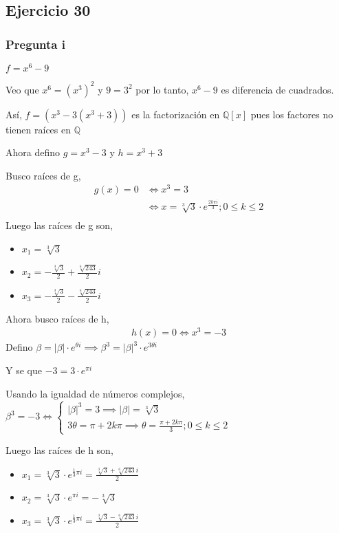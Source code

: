 \subsection{Ejercicio 30}

\subsubsection{Pregunta i}
$ f = x^6 - 9 $

Veo que $ x^6 = (x^3)^2 $ y $ 9 = 3^2 $ por lo tanto, $ x^6 - 9 $ es diferencia de cuadrados.

Así, $ f = (x^3 - 3 (x^3 + 3)) $ es la factorización en $ \mathbb{Q}[x] $ pues los factores no tienen raíces en $ \mathbb{Q} $

Ahora defino $ g = x^3 - 3 $ y $ h = x^3 + 3 $

Busco raíces de g,
\begin{align*}
    g(x) = 0 &\iff x^3 = 3 \\
    &\iff x = \sqrt[3]{3} \cdot e^{\frac{2k\pi i}{3}}; 0\leq k \leq 2 \\
\end{align*}
Luego las raíces de g son,
\begin{itemize}
    \item $ x_1 = \sqrt[3]{3} $
    \item $ x_2 = -\frac{\sqrt[3]{3}}{2} + \frac{\sqrt[6]{243}}{2}i $
    \item $ x_3 = -\frac{\sqrt[3]{3}}{2} - \frac{\sqrt[6]{243}}{2}i $
\end{itemize}

Ahora busco raíces de h,
\begin{align*}
    h(x) = 0 \iff x^3 = -3 
\end{align*}
Defino $ \beta = |\beta|\cdot e^{\theta i} \implies \beta^3 = |\beta|^3 \cdot e^{3\theta i} $

Y se que $ -3 = 3\cdot e^{\pi i} $

Usando la igualdad de números complejos,
$ \beta^3 = -3 \iff \begin{cases}
    |\beta|^3 = 3 \implies |\beta| = \sqrt[3]{3} \\
    3\theta = \pi + 2k\pi \implies \theta = \frac{\pi +2k\pi}{3}; 0\leq k \leq 2
\end{cases} $

Luego las raíces de h son,
\begin{itemize}
    \item $ x_1 = \sqrt[3]{3}\cdot e^{\frac{1}{3}\pi i} = \frac{\sqrt[3]{3} + \sqrt[6]{243}i}{2} $
    \item $ x_2 = \sqrt[3]{3}\cdot e^{\pi i} = -\sqrt[3]{3} $
    \item $ x_3 = \sqrt[3]{3}\cdot e^{\frac{1}{3}\pi i} = \frac{\sqrt[3]{3} - \sqrt[6]{243}i}{2} $
\end{itemize}

